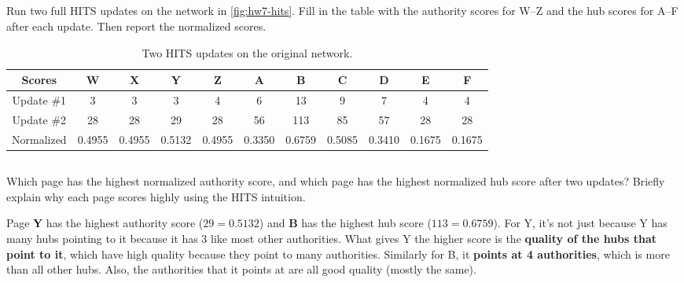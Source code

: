 \documentclass[newpages]{assignment}
\begin{document}
\subsection{}
\begin{problem}
    Run two full HITS updates on the network in \cref{fig:hw7-hits}. Fill in the table with the authority scores for W--Z and the hub scores for A--F after each update. Then report the normalized scores.

\end{problem}

\begin{table}[h]
    \caption{Two HITS updates on the original network.}
    \centering
    \begin{tabular}{ccccccccccc}
        \toprule
        Scores     & W      & X      & Y      & Z      & A      & B      & C      & D      & E      & F      \\
        \midrule
        Update \#1 & 3      & 3      & 3      & 4      & 6      & 13     & 9      & 7      & 4      & 4      \\
        Update \#2 & 28     & 28     & 29     & 28     & 56     & 113    & 85     & 57     & 28     & 28     \\
        \midrule
        Normalized & 0.4955 & 0.4955 & 0.5132 & 0.4955 & 0.3350 & 0.6759 & 0.5085 & 0.3410 & 0.1675 & 0.1675 \\
        \bottomrule
    \end{tabular}
\end{table}

\subsection{}
\begin{problem}
    Which page has the highest normalized authority score, and which page has the highest normalized hub score after two updates? Briefly explain why each page scores highly using the HITS intuition.
\end{problem}

\begin{solution}
    Page \textbf{Y} has the highest authority score ($29 = 0.5132$) and \textbf{B} has the highest hub score ($113 = 0.6759$). For Y, it's not just because Y has many hubs pointing to it because it has 3 like most other authorities. What gives Y the higher score is the \textbf{quality of the hubs that point to it}, which have high quality because they point to many authorities. Similarly for B, it \textbf{points at 4 authorities}, which is more than all other hubs. Also, the authorities that it points at are all good quality (mostly the same).
\end{solution}
\end{document}
